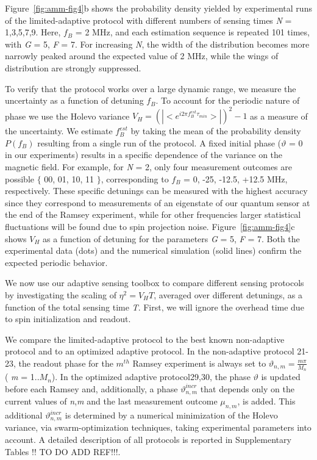 Figure \,\ref{fig:amm-fig4}b shows the probability density yielded by experimental runs of the limited-adaptive protocol with different numbers of sensing times \textit{N} = 1,3,5,7,9. Here,  $f_B$ = 2 MHz, and each estimation sequence is repeated 101 times, with \textit{G} = 5, \textit{F} = 7. For increasing \textit{N}, the width of the distribution becomes more narrowly peaked around the expected value of 2 MHz, while the wings of distribution are strongly suppressed. 

To verify that the protocol works over a large dynamic range, we measure the uncertainty as a function of detuning $f_B$. To account for the periodic nature of phase we use the Holevo variance $V_H = (|<e^{i2 \pi f_B^{est} \tau_{min}}>|)^2 - 1$ as a measure of the uncertainty. We estimate  $f_B^{est}$ by taking the mean of the probability density $P(f_B)$ resulting from a single run of the protocol. A fixed initial phase ($\vartheta$ = 0 in our experiments) results in a specific dependence of the variance on the magnetic field. For example, for \textit{N} = 2, only four measurement outcomes are possible $\{$ 00, 01, 10, 11 $\}$, corresponding to $f_B$ = 0, -25, -12.5, +12.5 MHz, respectively. These specific detunings can be measured with the highest accuracy since they correspond to measurements of an eigenstate of our quantum sensor at the end of the Ramsey experiment, while for other frequencies larger statistical fluctuations will be found due to spin projection noise. Figure \,\ref{fig:amm-fig4}c shows $V_H$ as a function of detuning for the parameters \textit{G} = 5, \textit{F} = 7. Both the experimental data (dots) and the numerical simulation (solid lines) confirm the expected periodic behavior.

We now use our adaptive sensing toolbox to compare different sensing protocols by investigating the scaling of $\eta^2 = V_H T$, averaged over different detunings, as a function of the total sensing time \textit{T}. First, we will ignore the overhead time due to spin initialization and readout. 

We compare the limited-adaptive protocol to the best known non-adaptive protocol and to an optimized adaptive protocol. In the non-adaptive protocol 21-23, the readout phase for the $m^{th}$ Ramsey experiment is always set to $\vartheta_{n,m} = \frac{m\pi}{M_n}$  ( \textit{m} = 1..$M_n$). In the optimized adaptive protocol29,30, the phase $\vartheta$ is updated before each Ramsey and, additionally, a phase $\vartheta_{n,m}^{incr}$ that depends only on the current values of \textit{n},\textit{m} and the last measurement outcome $\mu_{n,m}$, is added. This additional $\vartheta_{n,m}^{incr}$ is determined by a numerical minimization of the Holevo variance, via swarm-optimization techniques, taking experimental parameters into account. A detailed description of all protocols is reported in Supplementary Tables !! TO DO ADD REF!!!.

